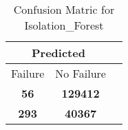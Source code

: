 \begin{table}[] 
\caption{Confusion Matric for Isolation_Forest} 
\label{Table: Prediction Accuracy-DMDIsolation_ForestOnlySunEKF-ignoreReflection-Reflection} 
\centering 
\begin{tabular} 
 {@{}ccc@{}} 
\toprule 
\multicolumn{2}{c}{\textbf{Predicted}}
 \\ \midrule 
\multicolumn{1}{|c|}{Failure} & 
\multicolumn{1}{c|}{No Failure}
 \\ \midrule 
\multicolumn{1}{|c|}{\color{red}\textbf{56}} & 
\multicolumn{1}{c|}{\color{green}\textbf{129412}}
 \\ \midrule 
\multicolumn{1}{|c|}{\color{green}\textbf{293}} & 
\multicolumn{1}{c|}{\color{red}\textbf{40367}}
 \\ \bottomrule 
\end{tabular} 
\end{table} 
